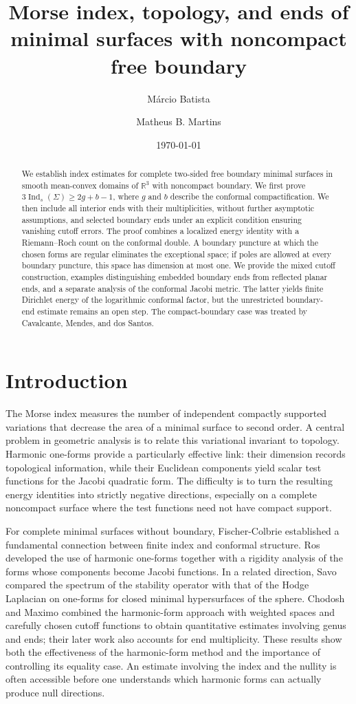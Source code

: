 \documentclass[11pt]{amsart}
\title[Morse index and noncompact free boundary]{Morse index, topology, and ends of minimal surfaces with noncompact free boundary}
\author{M\'arcio Batista}
\author{Matheus B. Martins}
\date{\today}
\numberwithin{equation}{section}
\theoremstyle{definition}
\theoremstyle{remark}
\newcommand{\R}{\mathbb R}
\DeclareMathOperator{\Ind}{Ind}
\begin{document}
\begin{abstract}
We establish index estimates for complete two-sided free boundary minimal surfaces in smooth mean-convex domains of $\R^3$ with noncompact boundary. We first prove $3\Ind_s(\Sigma)\ge 2g+b-1$, where $g$ and $b$ describe the conformal compactification. We then include all interior ends with their multiplicities, without further asymptotic assumptions, and selected boundary ends under an explicit condition ensuring vanishing cutoff errors. The proof combines a localized energy identity with a Riemann--Roch count on the conformal double. A boundary puncture at which the chosen forms are regular eliminates the exceptional space; if poles are allowed at every boundary puncture, this space has dimension at most one. We provide the mixed cutoff construction, examples distinguishing embedded boundary ends from reflected planar ends, and a separate analysis of the conformal Jacobi metric. The latter yields finite Dirichlet energy of the logarithmic conformal factor, but the unrestricted boundary-end estimate remains an open step. The compact-boundary case was treated by Cavalcante, Mendes, and dos Santos.
\end{abstract}
\maketitle
\enlargethispage{2pt}

\section{Introduction}\label{sec:introduction}
The Morse index measures the number of independent compactly supported variations that decrease the area of a minimal surface to second order. A central problem in geometric analysis is to relate this variational invariant to topology. Harmonic one-forms provide a particularly effective link: their dimension records topological information, while their Euclidean components yield scalar test functions for the Jacobi quadratic form. The difficulty is to turn the resulting energy identities into strictly negative directions, especially on a complete noncompact surface where the test functions need not have compact support.

For complete minimal surfaces without boundary, Fischer-Colbrie \cite{FC85} established a fundamental connection between finite index and conformal structure. Ros \cite{Ros06} developed the use of harmonic one-forms together
with a rigidity analysis of the forms whose components become Jacobi
functions. In a related direction, Savo \cite{Savo10} compared the
spectrum of the stability operator with that of the Hodge Laplacian
on one-forms for closed minimal hypersurfaces of the sphere.
Chodosh and Maximo \cite{CM16,CM23} combined the harmonic-form
approach with weighted spaces and carefully chosen cutoff functions
to obtain quantitative estimates involving genus and ends; their
later work also accounts for end multiplicity. These results show both the effectiveness of the harmonic-form method and the importance of controlling its equality case. An estimate involving the index and the nullity is often accessible before one understands which harmonic forms can actually produce null directions.
\end{document}
